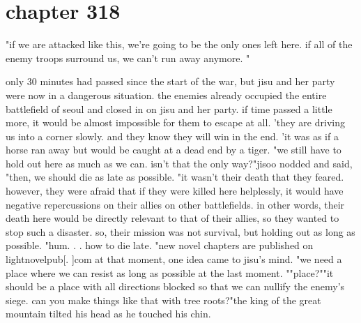 \section{chapter 318}

"if we are attacked like this, we're going to be the only ones left here.
 if all of the enemy troops surround us, we can't run away anymore.
"




only 30 minutes had passed since the start of the war, but jisu and her party were now in a dangerous situation.
 the enemies already occupied the entire battlefield of seoul and closed in on jisu and her party.
 if time passed a little more, it would be almost impossible for them to escape at all.
'they are driving us into a corner slowly.
 and they know they will win in the end.
'it was as if a horse ran away but would be caught at a dead end by a tiger.
"we still have to hold out here as much as we can.
 isn't that the only way?"jisoo nodded and said, "then, we should die as late as possible.
"it wasn't their death that they feared.
 however, they were afraid that if they were killed here helplessly, it would have negative repercussions on their allies on other battlefields.
in other words, their death here would be directly relevant to that of their allies, so they wanted to stop such a disaster.
so, their mission was not survival, but holding out as long as possible.
"hum.
.
.
how to die late.
"new novel chapters are published on lightnovelpub[.
]com at that moment, one idea came to jisu's mind.
"we need a place where we can resist as long as possible at the last moment.
""place?""it should be a place with all directions blocked so that we can nullify the enemy's siege.
 can you make things like that with tree roots?"the king of the great mountain tilted his head as he touched his chin.

